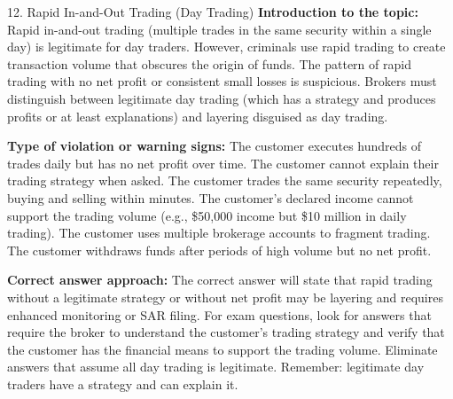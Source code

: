 \documentclass[11pt,a4paper]{beamer}
\begin{document}
\begin{frame}{12. Rapid In-and-Out Trading (Day Trading)}
\tiny
\noindent\textbf{Introduction to the topic:} Rapid in-and-out trading (multiple trades in the same security within a single day) is legitimate for day traders. However, criminals use rapid trading to create transaction volume that obscures the origin of funds. The pattern of rapid trading with no net profit or consistent small losses is suspicious. Brokers must distinguish between legitimate day trading (which has a strategy and produces profits or at least explanations) and layering disguised as day trading.

\vspace{0.1cm}
\noindent\textbf{Type of violation or warning signs:} The customer executes hundreds of trades daily but has no net profit over time. The customer cannot explain their trading strategy when asked. The customer trades the same security repeatedly, buying and selling within minutes. The customer's declared income cannot support the trading volume (e.g., \$50,000 income but \$10 million in daily trading). The customer uses multiple brokerage accounts to fragment trading. The customer withdraws funds after periods of high volume but no net profit.

\vspace{0.1cm}
\noindent\textbf{Correct answer approach:} The correct answer will state that rapid trading without a legitimate strategy or without net profit may be layering and requires enhanced monitoring or SAR filing. For exam questions, look for answers that require the broker to understand the customer's trading strategy and verify that the customer has the financial means to support the trading volume. Eliminate answers that assume all day trading is legitimate. Remember: legitimate day traders have a strategy and can explain it.
\end{frame}
\end{document}
